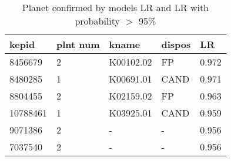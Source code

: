 \begin{table}[!htbp]
 \centering
 \caption{Planet confirmed by models LR and LR with probability $>$ 95\%}
 \label{dataLRLRcreftab} 
  \begin{tabular}
{| 
 p{}| 
 p{}| 
 p{}| 
 p{}| 
 p{}| 
}\hline 
\textbf{kepid} &\textbf{plnt num} &\textbf{kname} &\textbf{dispos} &\textbf{LR} \\ \hline 
8456679 &2 &K00102.02 &FP &0.972 \\ \hline 
8480285 &1 &K00691.01 &CAND &0.971 \\ \hline 
8804455 &2 &K02159.02 &FP &0.963 \\ \hline 
10788461 &1 &K03925.01 &CAND &0.959 \\ \hline 
9071386 &2 &- &- &0.956 \\ \hline 
7037540 &2 &- &- &0.956 \\ \hline 
\end{tabular} 
\end{table}